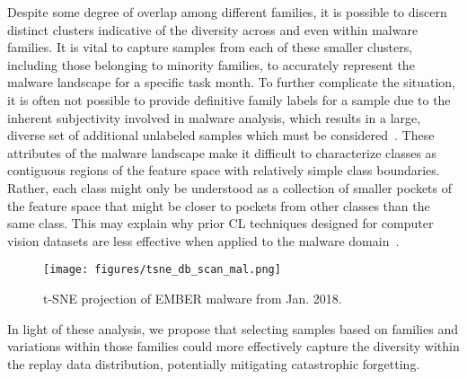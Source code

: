 Despite some degree of overlap among different families, it is possible to discern distinct clusters indicative of the diversity across and even within malware families. It is vital to capture samples from each of these smaller clusters, including those belonging to minority families, to accurately represent the malware landscape for a specific task month. 
To further complicate the situation, it is often not possible to provide definitive family labels for a sample due to the inherent subjectivity involved in malware analysis, which results in a large, diverse set of additional unlabeled samples which must be considered~\cite{kantchelian2015better}. These attributes of the malware landscape make it difficult to characterize classes as contiguous regions of the feature space with relatively simple class boundaries. Rather, each class might only be understood as a collection of smaller pockets of the feature space that might be closer to pockets from other classes than the same class. This may explain why prior CL techniques designed for computer vision datasets are less effective when applied to the malware domain~\cite{continual-learning-malware}. 








%

\begin{figure}[!t]
\centering
\vskip -0.3cm
\texttt{[image: figures/tsne\_db\_scan\_mal.png]}
\vskip -0.3cm
\caption{t-SNE projection of EMBER malware from Jan. 2018.}
\label{fig:ember_jan_mal}
\vskip -0.4cm
\end{figure}



In light of these analysis, we propose that selecting samples based on families and variations within those families could more effectively capture the diversity within the replay data distribution, potentially mitigating catastrophic forgetting. 





